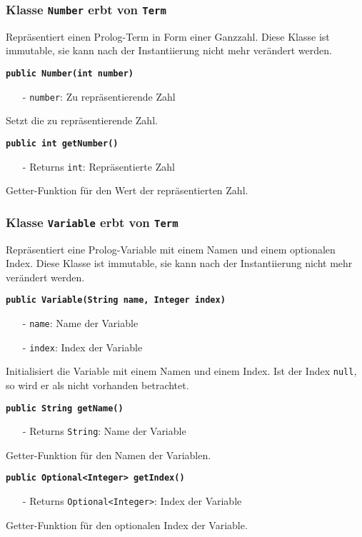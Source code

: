 \documentclass[parskip=full,11pt,twoside]{scrartcl}
\begin{document}
\subsubsection{Klasse \texttt{Number} erbt von \texttt{Term}}
Repräsentiert einen Prolog-Term in Form einer Ganzzahl. Diese Klasse ist immutable, sie kann nach der Instantiierung nicht mehr verändert werden.

\textbf{\texttt{public Number(int number)}}
\begin{itemize}[noitemsep]
	\item[-] \texttt{number}: Zu repräsentierende Zahl
\end{itemize}
Setzt die zu repräsentierende Zahl.

\textbf{\texttt{public int getNumber()}}
\begin{itemize}[noitemsep]
	\item[-] Returns \texttt{int}: Repräsentierte Zahl
\end{itemize}
Getter-Funktion für den Wert der repräsentierten Zahl.

\subsubsection{Klasse \texttt{Variable} erbt von \texttt{Term}}
Repräsentiert eine Prolog-Variable mit einem Namen und einem optionalen Index. Diese Klasse ist immutable, sie kann nach der Instantiierung nicht mehr verändert werden.

\textbf{\texttt{public Variable(String name, Integer index)}}
\begin{itemize}[noitemsep]
	\item[-] \texttt{name}: Name der Variable
	\item[-] \texttt{index}: Index der Variable
\end{itemize}
Initialisiert die Variable mit einem Namen und einem Index. Ist der Index \texttt{null}, so wird er als nicht vorhanden betrachtet.

\textbf{\texttt{public String getName()}}
\begin{itemize}[noitemsep]
	\item[-] Returns \texttt{String}: Name der Variable
\end{itemize}
Getter-Funktion für den Namen der Variablen.

\textbf{\texttt{public Optional<Integer> getIndex()}}
\begin{itemize}[noitemsep]
	\item[-] Returns \texttt{Optional<Integer>}: Index der Variable
\end{itemize}
Getter-Funktion für den optionalen Index der Variable.
\end{document}
